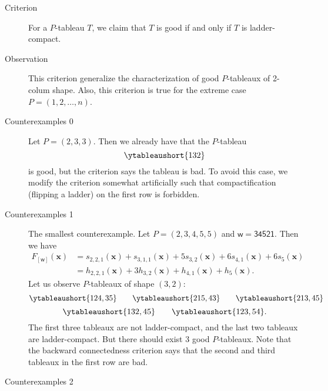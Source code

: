 \documentclass[11pt,reqno]{amsart}
\theoremstyle{definition}
\theoremstyle{remark}
\numberwithin{equation}{section}
\newcommand\xx{\mathbf{x}}
\newcommand\ww{\mathsf{w}}
\begin{document}
\begin{description}
  \item[Criterion] For a \( P \)-tableau \( T \), we claim that \( T \) is good if and only if
  \( T \) is ladder-compact.
  \item[Observation] This criterion generalize the characterization of good \( P \)-tableaux of
  2-colum shape. Also, this criterion is true for the extreme case \( P=(1,2,\dots,n) \).
  \item[Counterexamples 0] Let \( P=(2,3,3) \). Then we already have that the \( P \)-tableau
  \[
    \ytableaushort{132}
  \]
  is good, but the criterion says the tableau is bad. To avoid this case, we modify the criterion
  somewhat artificially such that compactification (flipping a ladder) on the first row is forbidden.
  \item[Counterexamples 1] The smallest counterexample. Let \( P=(2,3,4,5,5) \) and
  \( \ww=\mathsf{34521} \). Then we have
  \begin{align*}
    F_{[\ww]}(\xx)
      &= s_{2,2,1}(\xx) + s_{3,1,1}(\xx) + 5 s_{3,2}(\xx) + 6 s_{4,1}(\xx) + 6 s_5(\xx) \\
      &= h_{2,2,1}(\xx) + 3 h_{3,2}(\xx) + h_{4,1}(\xx) + h_5(\xx).
  \end{align*}
  Let us observe \( P \)-tableaux of shape \( (3,2) \):
  \[
    \ytableaushort{124,35} \qquad \ytableaushort{215,43} \qquad \ytableaushort{213,45}
  \]
  \[
    \ytableaushort{132,45} \qquad \ytableaushort{123,54}.
  \]
  The first three tableaux are not ladder-compact, and the last two tableaux are ladder-compact.
  But there should exist 3 good \( P \)-tableaux.
  Note that the backward connectedness criterion says that the second and third tableaux in the
  first row are bad.
  \item[Counterexamples 2] 
\end{description}
\end{document}
